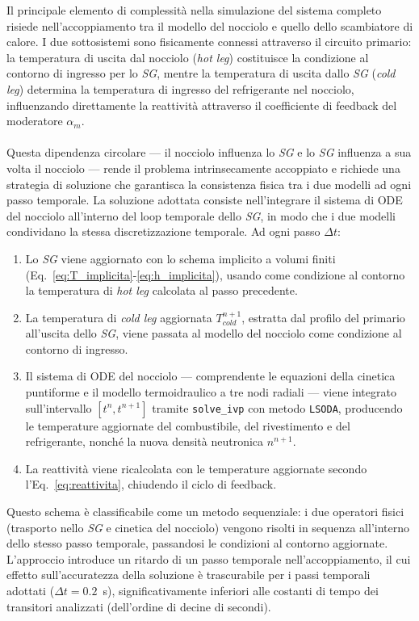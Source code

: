 \documentclass[12pt]{report}
\begin{document}
Il principale elemento di complessità nella simulazione del sistema completo 
risiede nell'accoppiamento tra il modello del nocciolo e quello dello scambiatore 
di calore. I due sottosistemi sono fisicamente connessi attraverso il circuito 
primario: la temperatura di uscita dal nocciolo (\textit{hot leg}) costituisce la 
condizione al contorno di ingresso per lo \textit{SG}, mentre la temperatura di 
uscita dallo \textit{SG} (\textit{cold leg}) determina la temperatura di ingresso 
del refrigerante nel nocciolo, influenzando direttamente la reattività attraverso 
il coefficiente di feedback del moderatore $\alpha_m$.\\\\
Questa dipendenza circolare — il nocciolo influenza lo \textit{SG} e lo 
\textit{SG} influenza a sua volta il nocciolo — rende il problema intrinsecamente 
accoppiato e richiede una strategia di soluzione che garantisca la consistenza 
fisica tra i due modelli ad ogni passo temporale.
La soluzione adottata consiste nell'integrare il sistema di ODE del nocciolo 
all'interno del loop temporale dello \textit{SG}, in modo che i due modelli 
condividano la stessa discretizzazione temporale. Ad ogni passo $\Delta t$:
\begin{enumerate}
    \item Lo \textit{SG} viene aggiornato con lo schema implicito a volumi finiti 
    (Eq.~\ref{eq:T_implicita}-\ref{eq:h_implicita}), usando come condizione al 
    contorno la temperatura di \textit{hot leg} calcolata al passo precedente.
    \item La temperatura di \textit{cold leg} aggiornata $T_{cold}^{n+1}$, 
    estratta dal profilo del primario all'uscita dello \textit{SG}, viene passata 
    al modello del nocciolo come condizione al contorno di ingresso.
    \item Il sistema di ODE del nocciolo — comprendente le equazioni della 
    cinetica puntiforme e il modello termoidraulico a tre nodi radiali — viene 
    integrato sull'intervallo $[t^n, t^{n+1}]$ tramite \texttt{solve\_ivp} con 
    metodo \texttt{LSODA}, producendo le temperature aggiornate del combustibile, 
    del rivestimento e del refrigerante, nonché la nuova densità neutronica $n^{n+1}$.
    \item La reattività viene ricalcolata con le temperature aggiornate secondo 
    l'Eq.~\eqref{eq:reattivita}, chiudendo il ciclo di feedback.
\end{enumerate}
Questo schema è classificabile come un metodo sequenziale: i due operatori fisici (trasporto nello \textit{SG} e cinetica del 
nocciolo) vengono risolti in sequenza all'interno dello stesso passo temporale, 
passandosi le condizioni al contorno aggiornate. L'approccio introduce un ritardo 
di un passo temporale nell'accoppiamento, il cui 
effetto sull'accuratezza della soluzione è trascurabile per i passi temporali 
adottati ($\Delta t = 0.2$~s), significativamente inferiori alle costanti di tempo 
dei transitori analizzati (dell'ordine di decine di secondi).
\end{document}
